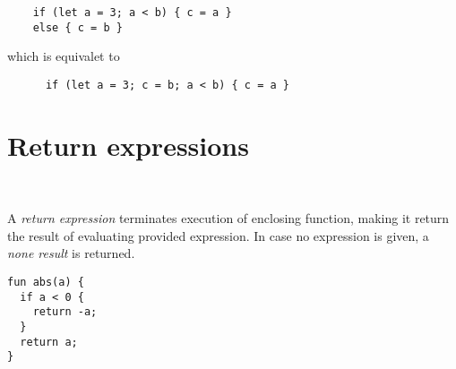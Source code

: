 \begin{example}
\begin{lstlisting}
    if (let a = 3; a < b) { c = a } 
    else { c = b }
\end{lstlisting}
\end{example}

\begin{center}
  which is equivalet to
\end{center}

\begin{example}
  \begin{lstlisting}
      if (let a = 3; c = b; a < b) { c = a } 
  \end{lstlisting}
  \end{example}

\section{Return expressions}

\begin{bnf}
   \eq {} \ 
\end{bnf}

A \emph{return expression} terminates execution of enclosing function, making it return the result of evaluating provided expression. In case no expression is given, a \emph{none result} is returned.

\begin{example}
\begin{lstlisting}
fun abs(a) {
  if a < 0 {
    return -a;
  }
  return a;
}
\end{lstlisting}
\end{example}
